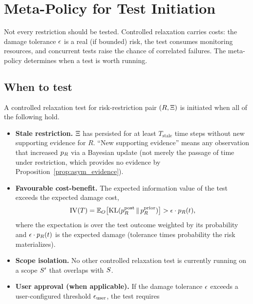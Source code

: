 \section{Meta-Policy for Test Initiation}
\label{sec:meta_policy}

Not every restriction should be tested.  Controlled relaxation
carries costs: the damage tolerance $\epsilon$ is a real (if
bounded) risk, the test consumes monitoring resources, and
concurrent tests raise the chance of correlated failures.  The
meta-policy determines when a test is worth running.

\subsection{When to test}

\begin{definition}
\label{def:test_initiation}
A controlled relaxation test for risk-restriction pair
$(R, \Xi)$ is initiated when all of the following hold.
\begin{itemize}
\item[(i)] \textbf{Stale restriction.}  $\Xi$ has
  persisted for at least $T_{\mathrm{stale}}$ time steps without
  new supporting evidence for $R$.  ``New supporting evidence''
  means any observation that increased $p_R$ via a Bayesian
  update (not merely the passage of time under restriction, which
  provides no evidence by
  Proposition~\ref{prop:asym_evidence}).
\item[(ii)] \textbf{Favourable cost-benefit.}  The expected
  information value of the test exceeds the expected damage cost,
  \begin{equation}
  \label{eq:iv_criterion}
  \mathrm{IV}(T)
     = \mathbb{E}_{O}\bigl[
         \mathrm{KL}(p_R^{\mathrm{post}} \,\|\, p_R^{\mathrm{prior}})
        \bigr]
     > \epsilon \cdot p_R(t),
  \end{equation}
  where the expectation is over the test outcome weighted by its
  probability and $\epsilon \cdot p_R(t)$ is the expected
  damage (tolerance times probability the risk materializes).
\item[(iii)] \textbf{Scope isolation.}  No other controlled
  relaxation test is currently running on a scope $S'$ that
  overlaps with $S$.
\item[(iv)] \textbf{User approval (when applicable).}  If the
  damage tolerance $\epsilon$ exceeds a user-configured
  threshold $\epsilon_{\mathrm{user}}$, the test requires

\end{itemize}
\end{definition}

